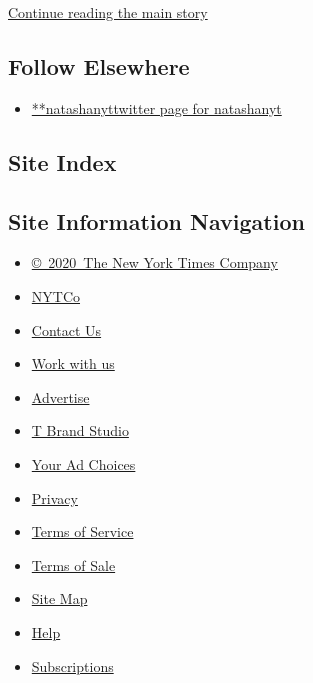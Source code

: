 \protect\hyperlink{after-mid2}{Continue reading the main story}

\hypertarget{follow-elsewhere}{%
\subsection{Follow Elsewhere}\label{follow-elsewhere}}

\begin{itemize}
\tightlist
\item
  \href{https://twitter.com/natashanyt}{**natashanyttwitter page for
  natashanyt}
\end{itemize}

\hypertarget{site-index}{%
\subsection{Site Index}\label{site-index}}

\hypertarget{site-information-navigation}{%
\subsection{Site Information
Navigation}\label{site-information-navigation}}

\begin{itemize}
\tightlist
\item
  \href{https://help.nytimes3xbfgragh.onion/hc/en-us/articles/115014792127-Copyright-notice}{©~2020~The
  New York Times Company}
\end{itemize}

\begin{itemize}
\tightlist
\item
  \href{https://www.nytco.com/}{NYTCo}
\item
  \href{https://help.nytimes3xbfgragh.onion/hc/en-us/articles/115015385887-Contact-Us}{Contact
  Us}
\item
  \href{https://www.nytco.com/careers/}{Work with us}
\item
  \href{https://nytmediakit.com/}{Advertise}
\item
  \href{http://www.tbrandstudio.com/}{T Brand Studio}
\item
  \href{https://www.nytimes3xbfgragh.onion/privacy/cookie-policy\#how-do-i-manage-trackers}{Your
  Ad Choices}
\item
  \href{https://www.nytimes3xbfgragh.onion/privacy}{Privacy}
\item
  \href{https://help.nytimes3xbfgragh.onion/hc/en-us/articles/115014893428-Terms-of-service}{Terms
  of Service}
\item
  \href{https://help.nytimes3xbfgragh.onion/hc/en-us/articles/115014893968-Terms-of-sale}{Terms
  of Sale}
\item
  \href{https://spiderbites.nytimes3xbfgragh.onion}{Site Map}
\item
  \href{https://help.nytimes3xbfgragh.onion/hc/en-us}{Help}
\item
  \href{https://www.nytimes3xbfgragh.onion/subscription?campaignId=37WXW}{Subscriptions}
\end{itemize}

